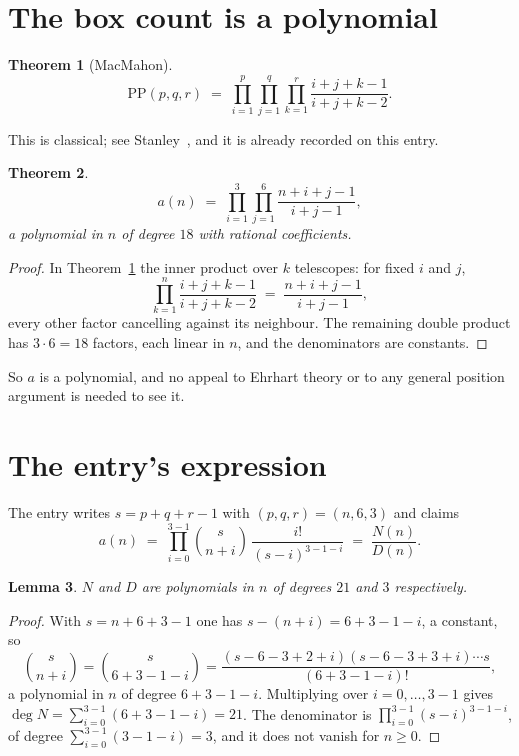 \documentclass[11pt,a4paper]{article}
\theoremstyle{plain}
\newtheorem{theorem}{Theorem}
\newtheorem{lemma}[theorem]{Lemma}
\theoremstyle{definition}
\begin{document}
\section{The box count is a polynomial}

\begin{theorem}[MacMahon]\label{thm:mm}
\[
\mathrm{PP}(p,q,r)\;=\;\prod_{i=1}^{p}\prod_{j=1}^{q}\prod_{k=1}^{r}
\frac{i+j+k-1}{i+j+k-2} .
\]
\end{theorem}

This is classical; see Stanley~\cite{stanley}, and it is already recorded on this entry.

\begin{theorem}\label{thm:poly}
\[
a(n)\;=\;\prod_{i=1}^{3}\prod_{j=1}^{6}\frac{n+i+j-1}{i+j-1},
\]
a polynomial in $n$ of degree $18$ with rational coefficients.
\end{theorem}

\begin{proof}
In Theorem~\ref{thm:mm} the inner product over $k$ telescopes: for fixed $i$ and $j$,
\[
\prod_{k=1}^{n}\frac{i+j+k-1}{i+j+k-2}\;=\;\frac{n+i+j-1}{i+j-1} ,
\]
every other factor cancelling against its neighbour. The remaining double product has
$3\cdot6=18$ factors, each linear in $n$, and the denominators are constants.
\end{proof}

So $a$ is a polynomial, and no appeal to Ehrhart theory or to any general position argument is
needed to see it.

\section{The entry's expression}

The entry writes $s=p+q+r-1$ with $(p,q,r)=(n,6,3)$ and claims
\[
a(n)\;=\;\prod_{i=0}^{3-1}\binom{s}{n+i}\,\frac{i!}{(s-i)^{3-1-i}}\;=\;
\frac{N(n)}{D(n)} .
\]

\begin{lemma}\label{lem:deg}
$N$ and $D$ are polynomials in $n$ of degrees $21$ and $3$ respectively.
\end{lemma}

\begin{proof}
With $s=n+6+3-1$ one has $s-(n+i)=6+3-1-i$, a constant, so
\[
\binom{s}{n+i}=\binom{s}{6+3-1-i}
=\frac{(s-6-3+2+i)(s-6-3+3+i)\cdots s}{(6+3-1-i)!},
\]
a polynomial in $n$ of degree $6+3-1-i$. Multiplying over $i=0,\dots,3-1$ gives
$\deg N=\sum_{i=0}^{3-1}(6+3-1-i)=21$. The denominator is
$\prod_{i=0}^{3-1}(s-i)^{3-1-i}$, of degree
$\sum_{i=0}^{3-1}(3-1-i)=3$, and it does not vanish for $n\ge0$.
\end{proof}
\end{document}
